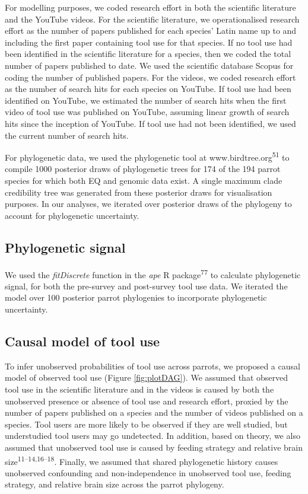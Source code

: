 \documentclass[
  man, donotrepeattitle,floatsintext]{apa6}
\begin{document}
For modelling purposes, we coded research effort in both the scientific
literature and the YouTube videos. For the scientific literature, we
operationalised research effort as the number of papers published for each
species' Latin name up to and including the first paper containing tool use for
that species. If no tool use had been identified in the scientific literature
for a species, then we coded the total number of papers published to date. We
used the scientific database Scopus for coding the number of published papers.
For the videos, we coded research effort as the number of search hits for each
species on YouTube. If tool use had been identified on YouTube, we estimated the
number of search hits when the first video of tool use was published on YouTube,
assuming linear growth of search hits since the inception of YouTube. If tool
use had not been identified, we used the current number of search hits.

For phylogenetic data, we used the phylogenetic tool at www.birdtree.org\textsuperscript{51} to compile 1000 posterior draws of phylogenetic trees for 174 of the
194 parrot species for which both EQ and genomic data exist. A single maximum
clade credibility tree was generated from these posterior draws for
visualisation purposes. In our analyses, we iterated over posterior draws of the
phylogeny to account for phylogenetic uncertainty.

\hypertarget{phylogenetic-signal}{%
\subsection{Phylogenetic signal}\label{phylogenetic-signal}}

We used the \emph{fitDiscrete} function in the \emph{ape} R package\textsuperscript{77} to
calculate phylogenetic signal, for both the pre-survey and post-survey tool use
data. We iterated the model over 100 posterior parrot phylogenies to incorporate
phylogenetic uncertainty.

\hypertarget{causal-model-of-tool-use}{%
\subsection{Causal model of tool use}\label{causal-model-of-tool-use}}

To infer unobserved probabilities of tool use across parrots, we proposed a
causal model of observed tool use (Figure \ref{fig:plotDAG}). We assumed that
observed tool use in the scientific literature and in the videos is caused by
both the unobserved presence or absence of tool use and research effort, proxied
by the number of papers published on a species and the number of videos
published on a species. Tool users are more likely to be observed if they are
well studied, but understudied tool users may go undetected. In addition, based
on theory, we also assumed that unobserved tool use is caused by feeding
strategy and relative brain size\textsuperscript{11--14,16--18}. Finally, we
assumed that shared phylogenetic history causes unobserved confounding and
non-independence in unobserved tool use, feeding strategy, and relative brain
size across the parrot phylogeny.
\end{document}
